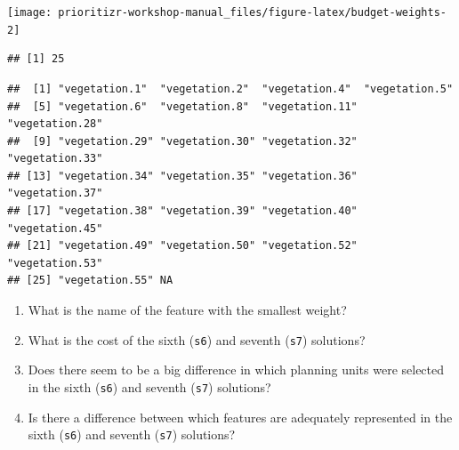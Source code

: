 \documentclass[12pt,]{book}
\newenvironment{Shaded}{\begin{snugshade}}{\end{snugshade}}
\newcommand{\KeywordTok}[1]{\textcolor[rgb]{0.13,0.29,0.53}{\textbf{#1}}}
\newcommand{\DataTypeTok}[1]{\textcolor[rgb]{0.13,0.29,0.53}{#1}}
\newcommand{\FloatTok}[1]{\textcolor[rgb]{0.00,0.00,0.81}{#1}}
\newcommand{\StringTok}[1]{\textcolor[rgb]{0.31,0.60,0.02}{#1}}
\newcommand{\CommentTok}[1]{\textcolor[rgb]{0.56,0.35,0.01}{\textit{#1}}}
\newcommand{\OtherTok}[1]{\textcolor[rgb]{0.56,0.35,0.01}{#1}}
\newcommand{\OperatorTok}[1]{\textcolor[rgb]{0.81,0.36,0.00}{\textbf{#1}}}
\newcommand{\NormalTok}[1]{#1}
\providecommand{\tightlist}{%
  \setlength{\itemsep}{0pt}\setlength{\parskip}{0pt}}
\let\BeginKnitrBlock\begin \let\EndKnitrBlock\end
\begin{document}
\begin{center}\texttt{[image: prioritizr-workshop-manual\_files/figure-latex/budget-weights-2]} \end{center}

\begin{Shaded}
\end{Shaded}

\begin{verbatim}
## [1] 25
\end{verbatim}

\begin{Shaded}
\end{Shaded}

\begin{verbatim}
##  [1] "vegetation.1"  "vegetation.2"  "vegetation.4"  "vegetation.5" 
##  [5] "vegetation.6"  "vegetation.8"  "vegetation.11" "vegetation.28"
##  [9] "vegetation.29" "vegetation.30" "vegetation.32" "vegetation.33"
## [13] "vegetation.34" "vegetation.35" "vegetation.36" "vegetation.37"
## [17] "vegetation.38" "vegetation.39" "vegetation.40" "vegetation.45"
## [21] "vegetation.49" "vegetation.50" "vegetation.52" "vegetation.53"
## [25] "vegetation.55" NA
\end{verbatim}

\BeginKnitrBlock{rmdquestion}
\begin{enumerate}
\def\labelenumi{\arabic{enumi}.}
\tightlist
\item
  What is the name of the feature with the smallest weight?
\item
  What is the cost of the sixth (\texttt{s6}) and seventh (\texttt{s7})
  solutions?
\item
  Does there seem to be a big difference in which planning units were
  selected in the sixth (\texttt{s6}) and seventh (\texttt{s7})
  solutions?
\item
  Is there a difference between which features are adequately
  represented in the sixth (\texttt{s6}) and seventh (\texttt{s7})
  solutions?
\end{enumerate}
\EndKnitrBlock{rmdquestion}
\end{document}
